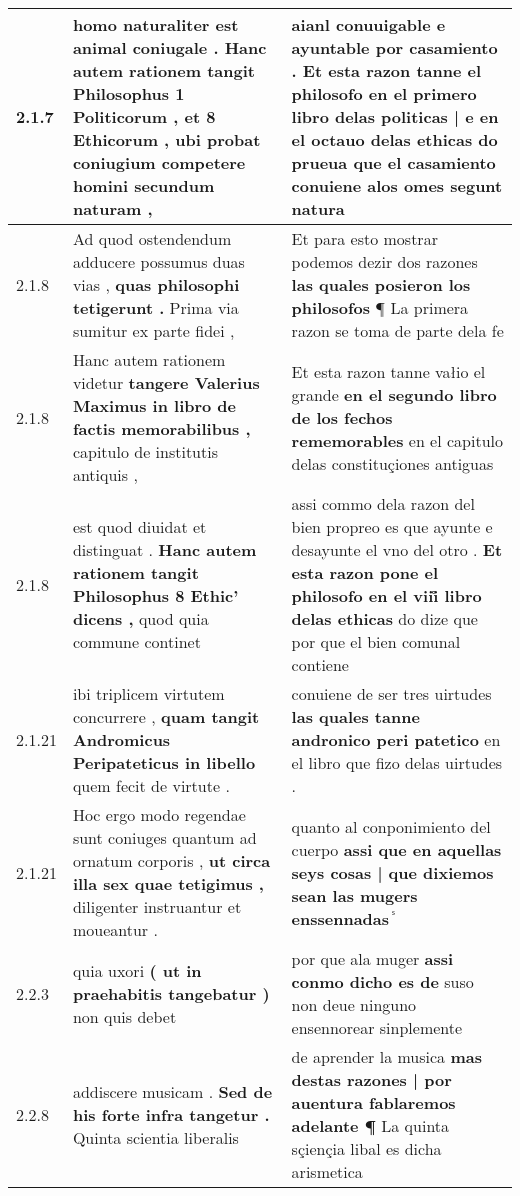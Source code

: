 \begin{tabular}{|p{1cm}|p{6.5cm}|p{6.5cm}|}
2.1.7 & homo naturaliter est animal coniugale . \textbf{ Hanc autem rationem tangit Philosophus 1 Politicorum , et 8 Ethicorum , } ubi probat coniugium competere homini secundum naturam , & aianl conuuigable e ayuntable por casamiento . \textbf{ Et esta razon tanne el philosofo en el primero libro delas politicas | e en el octauo delas ethicas do prueua } que el casamiento conuiene alos omes segunt natura \\\hline
2.1.8 & Ad quod ostendendum adducere possumus duas vias , \textbf{ quas philosophi tetigerunt . } Prima via sumitur ex parte fidei , & Et para esto mostrar podemos dezir dos razones \textbf{ las quales posieron los philosofos } ¶ La primera razon se toma de parte dela fe \\\hline
2.1.8 & Hanc autem rationem videtur \textbf{ tangere Valerius Maximus in libro de factis memorabilibus , } capitulo de institutis antiquis , & Et esta razon tanne vałio el grande \textbf{ en el segundo libro de los fechos rememorables } en el capitulo delas constituçiones antiguas \\\hline
2.1.8 & est quod diuidat et distinguat . \textbf{ Hanc autem rationem tangit Philosophus 8 Ethic’ dicens , } quod quia commune continet & assi commo dela razon del bien propreo es que ayunte e desayunte el vno del otro . \textbf{ Et esta razon pone el philosofo en el viii̊ libro delas ethicas } do dize que por que el bien comunal contiene \\\hline
2.1.21 & ibi triplicem virtutem concurrere , \textbf{ quam tangit Andromicus Peripateticus in libello } quem fecit de virtute . & conuiene de ser tres uirtudes \textbf{ las quales tanne andronico peri patetico } en el libro que fizo delas uirtudes . \\\hline
2.1.21 & Hoc ergo modo regendae sunt coniuges quantum ad ornatum corporis , \textbf{ ut circa illa sex quae tetigimus , } diligenter instruantur et moueantur . & quanto al conponimiento del cuerpo \textbf{ assi que en aquellas seys cosas | que dixiemos sean las mugers enssennadas } ᷤ \\\hline
2.2.3 & quia uxori \textbf{ ( ut in praehabitis tangebatur ) } non quis debet & por que ala muger \textbf{ assi conmo dicho es de } suso non deue ninguno ensennorear sinplemente \\\hline
2.2.8 & addiscere musicam . \textbf{ Sed de his forte infra tangetur . } Quinta scientia liberalis & de aprender la musica \textbf{ mas destas razones | por auentura fablaremos adelante ¶ } La quinta sçiençia libal es dicha arismetica \\\hline

\end{tabular}
